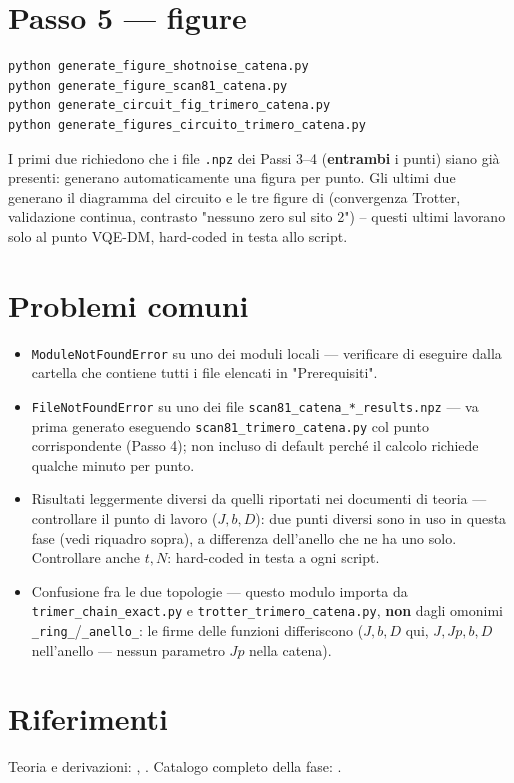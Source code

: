 \documentclass[11pt,a4paper]{article}
\begin{document}
\section*{Passo 5 --- figure}

\begin{verbatim}
python generate_figure_shotnoise_catena.py
python generate_figure_scan81_catena.py
python generate_circuit_fig_trimero_catena.py
python generate_figures_circuito_trimero_catena.py
\end{verbatim}
I primi due richiedono che i file \texttt{.npz} dei Passi 3--4 (\textbf{entrambi} i punti)
siano già presenti: generano automaticamente una figura per punto. Gli ultimi due generano il
diagramma del circuito e le tre figure di
\texttt{} (convergenza Trotter,
validazione continua, contrasto "nessuno zero sul sito 2") -- questi ultimi lavorano solo al
punto VQE-DM, hard-coded in testa allo script.

\section*{Problemi comuni}

\begin{itemize}
\item \texttt{ModuleNotFoundError} su uno dei moduli locali --- verificare di eseguire dalla
cartella che contiene tutti i file elencati in "Prerequisiti".
\item \texttt{FileNotFoundError} su uno dei file \texttt{scan81\_catena\_*\_results.npz} --- va
prima generato eseguendo \texttt{scan81\_trimero\_catena.py} col punto corrispondente (Passo 4);
non incluso di default perché il calcolo richiede qualche minuto per punto.
\item Risultati leggermente diversi da quelli riportati nei documenti di teoria --- controllare
il punto di lavoro ($J,b,D$): due punti diversi sono in uso in questa fase (vedi riquadro sopra),
a differenza dell'anello che ne ha uno solo. Controllare anche $t,N$: hard-coded in testa a ogni
script.
\item Confusione fra le due topologie --- questo modulo importa da
\texttt{trimer\_chain\_exact.py} e \texttt{trotter\_trimero\_catena.py}, \textbf{non} dagli
omonimi \texttt{\_ring\_}/\texttt{\_anello\_}: le firme delle funzioni differiscono
($J,b,D$ qui, $J,Jp,b,D$ nell'anello --- nessun parametro $Jp$ nella catena).
\end{itemize}

\section*{Riferimenti}

Teoria e derivazioni: \texttt{},
\texttt{}. Catalogo completo
della fase: \texttt{}.
\end{document}

